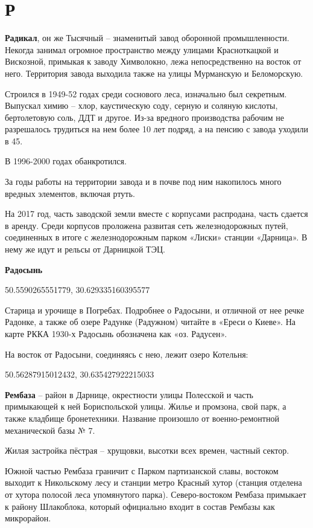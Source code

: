 \chapter*{Р}

\textbf{Радикал}, он же Тысячный – знаменитый завод оборонной промышленности. Некогда занимал огромное пространство между улицами Красноткацкой и Вискозной, примыкая к заводу Химволокно, лежа непосредственно на восток от него. Территория завода выходила также на улицы Мурманскую и Беломорскую.

Строился в 1949-52 годах среди соснового леса, изначально был секретным. Выпускал химию –  хлор, каустическую соду, серную и соляную кислоты, бертолетовую соль, ДДТ и другое. Из-за вредного производства рабочим не разрешалось трудиться на нем более 10 лет подряд, а на пенсию с завода уходили в 45.

В 1996-2000 годах обанкротился.

За годы работы на территории завода и в почве под ним накопилось много вредных элементов, включая ртуть.

На 2017 год, часть заводской земли вместе с корпусами распродана, часть сдается в аренду. Среди корпусов проложена развитая сеть железнодорожных путей, соединенных в итоге с железнодорожным парком «Лиски» станции «Дарница». В нему же идут и рельсы от Дарницкой ТЭЦ.\\

\medskip

\textbf{Радосынь} 

50.5590265551779, 30.629335160395577

Старица и урочище в Погребах. Подробнее о Радосыни, и отличной от нее речке Радонке, а также об озере Радунке (Радужном) читайте в «Ереси о Киеве». На карте РККА 1930-х Радосынь обозначена как «оз. Радусен». 

На восток от Радосыни, соединяясь с нею, лежит озеро Котельня:

50.56287915012432, 30.635427922215033\\

\medskip

\textbf{Рембаза} – район в Дарнице, окрестности улицы Полесской и часть примыкающей к ней Бориспольской улицы. Жилье и промзона, свой парк, а также кладбище бронетехники. Название произошло от военно-ремонтной механической базы № 7.

Жилая застройка пёстрая – хрущовки, высотки всех времен, частный сектор.

Южной частью Рембаза граничит с Парком партизанской славы, востоком выходит к Никольскому лесу и станции метро Красный хутор (станция отделена от хутора полосой леса упомянутого парка). Северо-востоком Рембаза примыкает к району Шлакоблока, который официально входит в состав Рембазы как микрорайон.

